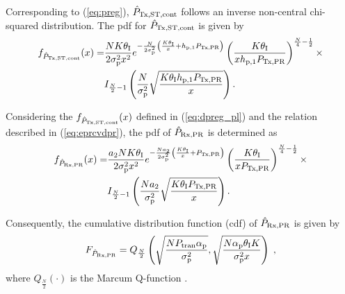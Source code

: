Corresponding to (\ref{eq:preg}), $\hat{P}_{\text{Tx,ST,cont}}$ follows an inverse non-central chi-squared distribution. The pdf for $\hat{P}_{\text{Tx,ST,cont}}$  is given by
\begin{align}
f_{\hat{P}_{\text{Tx,ST,cont}}}(x) =& \frac{N K \theta_{\text{I}}}{2\sigma^2_{\text{p}} x^2} e^{- \frac{N}{2 \sigma^2_{\text{p}}}\left( \frac{K  \theta_{\text{I}}}{x} + h_{\text{p,1}} P_{\text{Tx,PR}} \right)} \left( \frac{K \theta_{\text{I}}}{x h_{\text{p,1}} P_{\text{Tx,PR}}}   \right)^{\frac{N}{4} - \frac{1}{2}} \label{eq:dpreg_pl} \times \\
\quad & I_{\frac{N}{2}  - 1}\left( \frac{N}{\sigma^2_{\text{p}}} \sqrt{\frac{ K \theta_{\text{I}} h_{\text{p,1}} P_{\text{Tx,PR}}}{x}}  \right). \nonumber
\end{align}

Considering the $f_{\hat{P}_{\text{Tx,ST,cont}}}(x)$ defined in (\ref{eq:dpreg_pl}) and the relation described in (\ref{eq:eprcvdpr}), the pdf of $\hat{P}_{\text{Rx,PR}}$ is determined as 
\begin{align}
f_{\hat{P}_{\text{Rx,PR}}}(x) =& \frac{a_{\text{2}} N K \theta_{\text{I}}}{2\sigma^2_{\text{p}} x^2} e^{- \frac{N a_{\text{2}}}{2 \sigma^2_{\text{p}}}\left( \frac{K  \theta_{\text{I}}}{x} + P_{\text{Tx,PR}} \right)} \left( \frac{K \theta_{\text{I}}}{x P_{\text{Tx,PR}}}   \right)^{\frac{N}{4} - \frac{1}{2}} \times \label{eq:dpp_pl} \\
\quad & I_{\frac{N}{2}  - 1}\left( \frac{N a_{\text{2}}}{\sigma^2_{\text{p}}} \sqrt{\frac{ K \theta_{\text{I}} P_{\text{Tx,PR}}}{x}}  \right). \nonumber
\end{align}

Consequently, the cumulative distribution function (cdf) of $\hat{P}_{\text{Rx,PR}}$ is given by %
\begin{equation}
	\label{kumu}
	F_{\hat{P}_{\text{Rx,PR}}} = Q_{\frac{N}{2}}\left(\sqrt{\frac{N P_\textrm{tran} \alpha_\textrm{p}}{\sigma_\textrm{p}^2}},\sqrt{\frac{N \alpha_\textrm{p} \theta_\textrm{I} K}{\sigma_\textrm{p}^2 x}}\right) \;  ,
\end{equation}
where $Q_{\frac{N}{2}}(\cdot)$ is the Marcum Q-function \cite{Jef00}.

